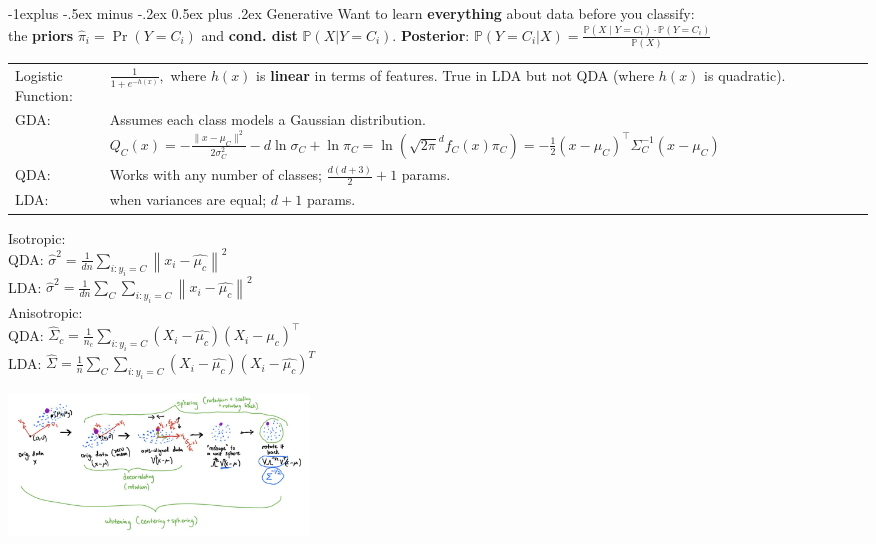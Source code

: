 \documentclass[10pt,landscape]{article}
\makeatletter
\newcommand{\wrap}[3]{\left#1#3\right#2}
\renewcommand{\subsection}{\@startsection{subsection}{2}{0mm}%
                                {-1explus -.5ex minus -.2ex}%
                                {0.5ex plus .2ex}%
                                {\normalfont\normalsize\bfseries}}
\makeatother
\begin{document}
\begin{multicols}{3}
\subsection{Generative}
Want to learn \textbf{everything} about data before you classify: \\
the \textbf{priors} $\hat\pi_i=\Pr(Y=C_i)$ and \textbf{cond. dist} $\mathbb{P}(X|Y=C_i)$.
\textbf{Posterior}: $\mathbb{P}(Y=C_i | X) = \frac{\mathbb{P}(X \mid Y = C_i) \cdot \mathbb{P}(Y=C_i)}{\mathbb{P}(X)}$ 
\begin{tabular}{@{}p{\the\MyLen}%
                @{}p{\linewidth-\the\MyLen}@{}}
Logistic Function: & $\frac{1}{1 + e^{-h(x)}}, $ where $h(x)$ is \textbf{linear} in terms of features. True in LDA but not QDA (where $h(x)$ is quadratic).\\
GDA: & Assumes each class models a Gaussian distribution. \linebreak $Q_C(x) = -\frac{\|x - \mu_C\|^2}{2 \sigma_C^2} - d \ln \sigma_C + \ln \pi_C=\ln{\wrap(){\sqrt{2\pi}^d f_C(x)\pi_C}}=-\frac12(x-\mu_C)^\top\Sigma_C^{-1}(x-\mu_C)$ \\
QDA:  &  Works with any number of classes; $\frac{d(d+3)}{2}+1$ params. \\
LDA:  &  when variances are equal; $d+1$ params.\\
\end{tabular}
Isotropic:\\
\quad QDA: $\widehat{\sigma }^2 = \frac{1}{dn} \sum_{i : y_i = C}^{} \left \| x_i - \widehat{\mu _c} \right \|^2$\\
\quad LDA: $\widehat{\sigma }^2 = \frac{1}{dn} \sum_{C}^{}\sum_{i : y_i = C}^{} \left \| x_i - \widehat{\mu _c} \right \|^2$\\

Anisotropic:\\
\quad QDA: $\widehat{\Sigma}_c = \frac{1}{n_c} \sum_{i : y_i = C}^{} (X_i - \widehat{\mu _c})(X_i - \widehat{\mu _c})^\top$\\
\quad LDA: $\widehat{\Sigma} = \frac{1}{n} \sum_{C}^{}\sum_{i : y_i = C}^{} (X_i - \widehat{\mu _c})(X_i - \widehat{\mu _c})^T$

\includegraphics[width=80mm]{whitening.png}



\end{multicols}
\end{document}
